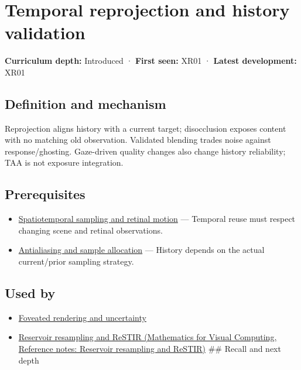 \hypertarget{appendix-0727340a4428}{}\label{referencestart:appendix-0727340a4428}
\section{Temporal reprojection and history validation}\label{appendix-0727340a4428-temporal-reprojection-and-history-validation}

\textbf{Curriculum depth:} Introduced · \textbf{First seen:} XR01 · \textbf{Latest development:} XR01

\subsection{Definition and mechanism}\label{appendix-0727340a4428-definition-and-mechanism}

Reprojection aligns history with a current target; disocclusion exposes content with no matching old observation. Validated blending trades noise against response/ghosting. Gaze-driven quality changes also change history reliability; TAA is not exposure integration.

\subsection{Prerequisites}\label{appendix-0727340a4428-prerequisites}

\begin{itemize}
\tightlist
\item
  \hyperref[appendix-70895739febb]{Spatiotemporal sampling and retinal motion} --- Temporal reuse must respect changing scene and retinal observations.
\item
  \hyperref[appendix-4192b2bdd21e]{Antialiasing and sample allocation} --- History depends on the actual current/prior sampling strategy.
\end{itemize}

\subsection{Used by}\label{appendix-0727340a4428-used-by}

\begin{itemize}
\item
  \hyperref[appendix-5878b813b732]{Foveated rendering and uncertainty}
\item
  \href{../02-Mathematics-for-Visual-Computing/main.pdf\#nameddest=appendix-68be451b78b1}{Reservoir resampling and ReSTIR (Mathematics for Visual Computing, Reference notes: Reservoir resampling and ReSTIR)} \#\# Recall and next depth
\end{itemize}

